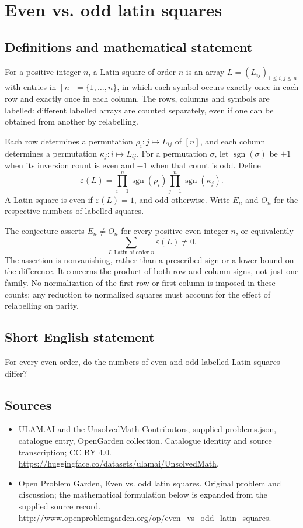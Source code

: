 \documentclass[11pt,a4paper]{article}
\begin{document}
\section*{Even vs. odd latin squares}\label{statement}

\subsection{Definitions and mathematical statement}
For a positive integer $n$, a Latin square of order $n$ is an array
$L=(L_{ij})_{1\le i,j\le n}$ with entries in $[n]=\{1,\ldots,n\}$, in which
each symbol occurs exactly once in each row and exactly once in each column.
The rows, columns and symbols are labelled: different labelled arrays are
counted separately, even if one can be obtained from another by relabelling.

Each row determines a permutation $\rho_i:j\mapsto L_{ij}$ of $[n]$, and
each column determines a permutation $\kappa_j:i\mapsto L_{ij}$.
For a permutation $\sigma$, let $\operatorname{sgn}(\sigma)$ be $+1$ when
its inversion count is even and $-1$ when that count is odd. Define
\[
 \varepsilon(L)=\prod_{i=1}^n\operatorname{sgn}(\rho_i)
                 \prod_{j=1}^n\operatorname{sgn}(\kappa_j).
\]
A Latin square is even if $\varepsilon(L)=1$, and odd otherwise. Write
$E_n$ and $O_n$ for the respective numbers of labelled squares.

The conjecture asserts $E_n\ne O_n$ for every positive even integer $n$,
or equivalently
\[
 \sum_{L\text{ Latin of order }n}\varepsilon(L)\ne0.
\]
The assertion is nonvanishing, rather than a prescribed sign or a lower
bound on the difference. It concerns the product of both row and column
signs, not just one family. No normalization of the first row or first
column is imposed in these counts; any reduction to normalized squares
must account for the effect of relabelling on parity.
\subsection{Short English statement}
For every even order, do the numbers of even and odd labelled Latin squares differ?
\subsection{Sources}
\begin{itemize}
\item[S1] ULAM.AI and the UnsolvedMath Contributors, supplied problems.json, catalogue entry, OpenGarden collection. Catalogue identity and source transcription; CC BY 4.0.
\url{https://huggingface.co/datasets/ulamai/UnsolvedMath}.
\item[S2] Open Problem Garden, Even vs. odd latin squares. Original problem and discussion; the mathematical formulation below is expanded from the supplied source record.
\url{http://www.openproblemgarden.org/op/even_vs_odd_latin_squares}.
\end{itemize}
\end{document}
